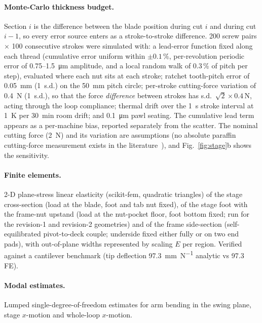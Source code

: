 \documentclass[11pt,a4paper]{article}
\begin{document}
\paragraph{Monte-Carlo thickness budget.} Section $i$ is the difference between the blade position during cut $i$ and during cut $i-1$, so every error source enters as a stroke-to-stroke difference. 200 screw pairs $\times$ 100 consecutive strokes were simulated with: a lead-error function fixed along each thread (cumulative error uniform within $\pm0.1\,\%$, per-revolution periodic error of 0.75--\SI{1.5}{\micro\metre} amplitude, and a local random walk of 0.3\,\% of pitch per step), evaluated where each nut sits at each stroke; ratchet tooth-pitch error of \SI{0.05}{\milli\metre} (1~s.d.) on the \SI{50}{\milli\metre} pitch circle; per-stroke cutting-force variation of \SI{0.4}{\newton} (1~s.d.), so that the force \emph{difference} between strokes has s.d.\ $\sqrt2\times0.4$\,N, acting through the loop compliance; thermal drift over the \SI{1}{\second} stroke interval at \SI{1}{\kelvin} per \SI{30}{\minute} room drift; and \SI{0.1}{\micro\metre} pawl seating. The cumulative lead term appears as a per-machine bias, reported separately from the scatter. The nominal cutting force (\SI{2}{\newton}) and its variation are assumptions (no absolute paraffin cutting-force measurement exists in the literature~\citep{Willis1995}), and Fig.~\ref{fig:stage}b shows the sensitivity.

\paragraph{Finite elements.}\label{sec:fe} 2-D plane-stress linear elasticity (scikit-fem, quadratic triangles) of the stage cross-section (load at the blade, foot and tab nut fixed), of the stage foot with the frame-nut upstand (load at the nut-pocket floor, foot bottom fixed; run for the revision-1 and revision-2 geometries) and of the frame side-section (self-equilibrated pivot-to-deck couple; underside fixed either fully or on two end pads), with out-of-plane widths represented by scaling $E$ per region. Verified against a cantilever benchmark (tip deflection \SI{97.3}{\milli\metre\per\newton} analytic vs 97.3 FE).

\paragraph{Modal estimates.} Lumped single-degree-of-freedom estimates for arm bending in the swing plane, stage $x$-motion and whole-loop $x$-motion.
\end{document}
